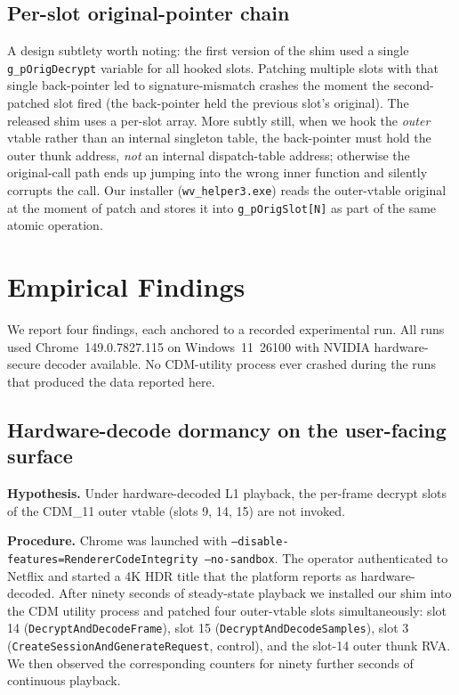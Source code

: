 \documentclass[11pt,letterpaper]{article}
\begin{document}
\subsection{Per-slot original-pointer chain}
\label{sec:runtime-orig}

A design subtlety worth noting: the first version of the shim used a
single \texttt{g\_pOrigDecrypt} variable for all hooked slots.
Patching multiple slots with that single back-pointer led to
signature-mismatch crashes the moment the second-patched slot fired
(the back-pointer held the previous slot's original).  The released
shim uses a per-slot array.  More subtly still, when we hook the
\emph{outer} vtable rather than an internal singleton table, the
back-pointer must hold the outer thunk address, \emph{not} an
internal dispatch-table address; otherwise the original-call path
ends up jumping into the wrong inner function and silently corrupts
the call.  Our installer (\texttt{wv\_helper3.exe}) reads the
outer-vtable original at the moment of patch and stores it into
\texttt{g\_pOrigSlot[N]} as part of the same atomic operation.

\section{Empirical Findings}
\label{sec:findings}

We report four findings, each anchored to a recorded experimental
run.  All runs used Chrome~149.0.7827.115 on Windows~11~26100 with
NVIDIA hardware-secure decoder available.  No CDM-utility process
ever crashed during the runs that produced the data reported here.

\subsection{Hardware-decode dormancy on the user-facing surface}
\label{sec:findings-dormancy}

\textbf{Hypothesis.}  Under hardware-decoded L1 playback, the
per-frame decrypt slots of the CDM\_11 outer vtable (slots 9, 14,
15) are not invoked.

\textbf{Procedure.}  Chrome was launched with
\texttt{--disable-features=RendererCodeIntegrity --no-sandbox}.  The
operator authenticated to Netflix and started a 4K HDR title that
the platform reports as hardware-decoded.  After ninety seconds of
steady-state playback we installed our shim into the CDM utility
process and patched four outer-vtable slots simultaneously: slot 14
(\texttt{DecryptAndDecodeFrame}), slot 15
(\texttt{DecryptAndDecodeSamples}), slot 3
(\texttt{CreateSessionAndGenerateRequest}, control), and the slot-14
outer thunk RVA.  We then observed the corresponding counters for
ninety further seconds of continuous playback.
\end{document}
